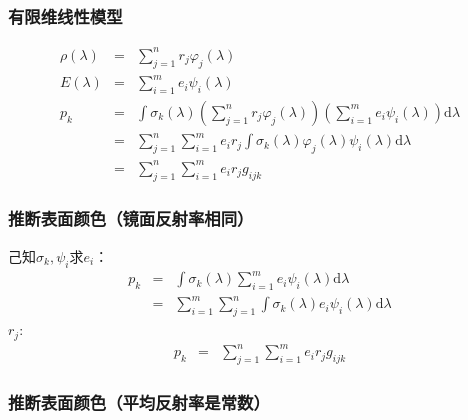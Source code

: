 \documentclass{beamer}
\newcommand{\mathd}{\mathrm{d}}
\newcommand{\nospace}{}
\begin{document}
{{\qquad{}}{\begin{frame}
  \frametitle{有限维线性模型}
  \begin{eqnarray*}
    \rho (\lambda) & = & \sum_{j = 1}^n r_j \varphi_j (\lambda)\\
    E (\lambda) & = & \sum_{i = 1}^m e_i \psi_i (\lambda)\\
    p_k & = & \int \sigma_k (\lambda) \left( \sum_{j = 1}^n r_j \varphi_j
    (\lambda) \right) \left( \sum_{i = 1}^m e_i \psi_i (\lambda) \right)
    \mathd \lambda\\
    & = & \sum_{j = 1}^n \sum_{i = 1}^m e_i r_j \int \sigma_k (\lambda)
    \varphi_j (\lambda) \psi_i (\lambda) \mathd \lambda\\
    & = & \sum_{j = 1}^n \sum_{i = 1}^m e_i r_j g_{i \nospace j \nospace k}
  \end{eqnarray*}
\end{frame}}{\begin{frame}
  \frametitle{推断表面颜色（镜面反射率相同）}
  
  己知$\sigma_k, \psi_i$求$e_i$：
  \begin{eqnarray*}
    p_k & = & \int \sigma_k (\lambda) \sum_{i = 1}^m e_i \psi_i (\lambda)
    \mathd \lambda\\
    & = & \sum_{i = 1}^m \sum_{j = 1}^n \int \sigma_k (\lambda) e_i \psi_i
    (\lambda) \mathd \lambda
  \end{eqnarray*}
  $r_j$:
  \begin{eqnarray*}
    p_k & = & \sum_{j = 1}^n \sum_{i = 1}^m e_i r_j g_{i \nospace j \nospace
    k}
  \end{eqnarray*}
\end{frame}}{\begin{frame}
  \frametitle{推断表面颜色（平均反射率是常数）}
  

\end{frame}}}
\end{document}
